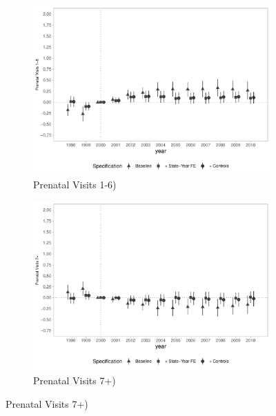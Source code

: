 \begin{figure}[h]
\begin{center}
\begin{subfigure}{0.48\textwidth}
    \end{subfigure}
    \begin{subfigure}{0.48\textwidth}
        \centering
        \caption{\scriptsize Prenatal Visits 1-6)}\label{fig:access3_c}
        \includegraphics[width=\textwidth]{plots/birth/birth_prenat_1_6_dist_ec29_baseline_dist_ec29_baseline_full.pdf}
    \end{subfigure}
    \begin{subfigure}{0.48\textwidth}
        \centering
        \caption{\scriptsize Prenatal Visits 7+)}\label{fig:access3_d}
        \includegraphics[width=\textwidth]{plots/birth/birth_prenat_7_plus_dist_ec29_baseline_dist_ec29_baseline_full.pdf}
    \end{subfigure}
    
    
    
    \end{center}
    
\end{figure}


